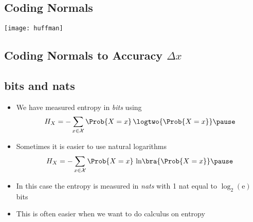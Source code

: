 
\begin{slide}
\section[-2]{Coding Normals}

\begin{center}
  \texttt{[image: huffman]}
\end{center}
\end{slide}


\begin{slide}
\section{Coding Normals to Accuracy $\Delta x$}

\pb \pause {}
\begin{center}
  \pause
\end{center}
\end{slide}



\begin{slide}
\section{bits and nats}

\begin{PauseHighLight}
  \begin{itemize}
  \item We have measured entropy in \emph{bits} using
    \begin{align*}
      H_X = - \sum_{x\in\mathcal{X}} \Prob{X=x} \, \logtwo{\strut \Prob{X=x}}\pause
    \end{align*}
  \item Sometimes it is easier to use natural logarithms
    \begin{align*}
      H_X = - \sum_{x\in\mathcal{X}} \Prob{X=x} \, \ln\!\bra{\strut \Prob{X=x}}\pause
    \end{align*}
  \item In this case the entropy is measured in \emph{nats} with 1 nat
    equal to $\log_2(\mathrm{e})$ bits\pause
  \item This is often easier when we want to do calculus on entropy\pause
  \end{itemize}
\end{PauseHighLight}

\end{slide}


